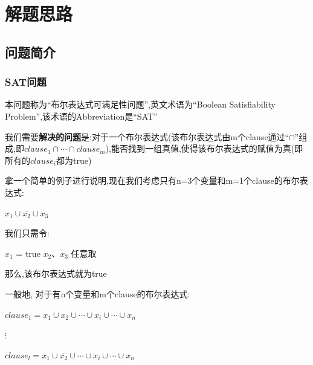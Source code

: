 \section{解题思路}        
    \subsection{问题简介}
        \subsubsection{SAT问题}
            本问题称为``布尔表达式可满足性问题'',英文术语为``Boolean Satisfiability Problem'',该术语的Abbreviation是``SAT'' \par
                我们需要\textbf{解决的问题}是:对于一个布尔表达式(该布尔表达式由m个clause通过``$\cap$''组成,即$clause_{1} \cap \cdots \cap clause_{m}$),能否找到一组真值,使得该布尔表达式的赋值为真(即所有的$clause_{i}$都为true)\par
                拿一个简单的例子进行说明,现在我们考虑只有n=3个变量和m=1个clause的布尔表达式:

            \begin{center}
                $x_{1} \cup \overline{x_{2}} \cup x_{3}$
            \end{center}

            \par
            我们只需令:
        
            \begin{center}
                $x_{1}$ = true \quad $x_{2}$、$x_{3}$ 任意取
            \end{center}
            
            \par
            那么,该布尔表达式就为true
            \par
            一般地, 对于有n个变量和m个clause的布尔表达式:

            \begin{center}
                $clause_{1} = x_{1} \cup x_{2} \cup \cdots \cup x_{i} \cup \cdots \cup x_{n}$
            \end{center}
            
            \begin{center}
                $\vdots$
            \end{center}

            \begin{center}
                $clause_{l} = x_{1} \cup \overline{x_{2}} \cup \cdots \cup x_{i} \cup \cdots \cup x_{n}$
            \end{center}

